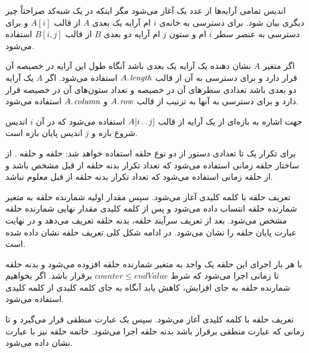
اندیس تمامی آرایه‌ها از عدد یک آغاز می‌شود مگر اینکه در یک شبه‌کد صراحتاً چیز دیگری بیان شود. برای دسترسی به خانه‌‌ی {$i$} ام آرایه یک بعدی {$A$} از قالب {$A[i]$} و برای دسترسی به عنصر سطر {$i$} ام و ستون {$j$} ام آرایه دو بعدی {$B$} از قالب {$B[i,j]$} استفاده می‌شود. 

اگر متغیر {$A$} نشان دهنده یک آرایه یک بعدی باشد آنگاه طول این آرایه در خصیصه {} آن قرار دارد و برای دسترسی به آن از قالب {$A.\hspace*{1pt}\mathit{length}$} استفاده می‌شود. اگر {$A$} یک آرایه دو بعدی باشد تعدادی سطرهای آن در خصیصه {} و تعداد ستون‌های آن در خصیصه {} قرار دارد و برای دسترسی به آنها به ترتیب از قالب {$A.\hspace*{1pt}\mathit{row}$} و {$A.\hspace*{1pt}\mathit{column}$} استفاده می‌شود. 

جهت اشاره به بازه‌ای از یک آرایه از قالب {$A[i\mathinner{\ldotp\ldotp} j]$} استفاده می‌شود که در آن {$i$} اندیس شروع بازه و {$j$} اندیس پایان بازه است.


برای تکرار یک تا تعدادی دستور از دو نوع حلقه استفاده خواهد شد: حلقه {} و حلقه {}. از ساختار حلقه {} زمانی استفاده می‌شود که تعداد تکرار بدنه حلقه از قبل مشخص باشد و از حلقه {} زمانی استفاده می‌شود که تعداد تکرار بدنه حلقه از قبل معلوم نباشد.

تعریف حلقه {} با کلمه کلیدی {} آغاز می‌شود. سپس مقدار اولیه شمارنده حلقه به متغیر شمارنده حلقه انتساب داده می‌شود و پس از کلمه کلیدی {} مقدار نهایی شمارنده حلقه مشخص می‌شود. بعد از تعریف سرآیند حلقه، بدنه حلقه تعریف می‌دهد و در نهایت عبارت {} پایان حلقه را نشان می‌شود. در ادامه شکل کلی تعریف حلقه {} نشان داده شده است.

\begin{latin}
\begin{algorithmic}[1]
	\State	{}
\EndFor
\end{algorithmic}
\end{latin}

با هر بار اجرای این حلقه یک واحد به متغیر شمارنده حلقه افزوده می‌شود و بدنه حلقه تا زمانی اجرا می‌شود که شرط {$\mathit{counter} \leqslant \mathit{endValue}$} برقرار باشد. اگر بخواهیم شمارنده حلقه به جای افزایش، کاهش یابد آنگاه به جای کلمه کلیدی {} از کلمه کلیدی {} استفاده می‌شود.

تعریف حلقه {} با کلمه کلیدی {} آغاز می‌شود. سپس یک عبارت منطقی قرار می‌گیرد و تا زمانی که عبارت منطقی برقرار باشد بدنه حلقه اجرا می‌شود. خاتمه حلقه {} نیز با عبارت {} نشان داده می‌شود.

